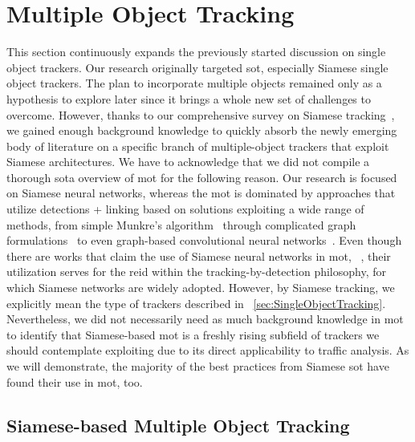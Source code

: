 \section{Multiple Object Tracking}
\label{sec:MultipleObjectTracking}

This section continuously expands the previously started discussion on single object trackers. Our research originally targeted \gls{sot}, especially Siamese single object trackers. The plan to incorporate multiple objects remained only as a hypothesis to explore later since it brings a whole new set of challenges to overcome. However, thanks to our comprehensive survey on Siamese tracking~\cite{ondrasovic2021siamese}, we gained enough background knowledge to quickly absorb the newly emerging body of literature on a specific branch of multiple-object trackers that exploit Siamese architectures. We have to acknowledge that we did not compile a thorough \gls{sota} overview of \gls{mot} for the following reason. Our research is focused on Siamese neural networks, whereas the \gls{mot} is dominated by approaches that utilize detections + linking based on solutions exploiting a wide range of methods, from simple Munkre's algorithm~\cite{munkres1957assignment} through complicated graph formulations~\cite{chen2001motdynamicgraph} to even graph-based convolutional neural networks~\cite{papakis2021gcnnmatch}. Even though there are works that claim the use of Siamese neural networks in \gls{mot}, \egtext{}~\cite{cuan2018deepsiammot}, their utilization serves for the \gls{reid} within the tracking-by-detection philosophy, for which Siamese networks are widely adopted. However, by Siamese tracking, we explicitly mean the type of trackers described in \sectiontext{}~\ref{sec:SingleObjectTracking}. Nevertheless, we did not necessarily need as much background knowledge in \gls{mot} to identify that Siamese-based \gls{mot} is a freshly rising subfield of trackers we should contemplate exploiting due to its direct applicability to traffic analysis. As we will demonstrate, the majority of the best practices from Siamese \gls{sot} have found their use in \gls{mot}, too.

\subsection{Siamese-based Multiple Object Tracking}
\label{ssec:SiameseBasedMultipleObjectTracking}

